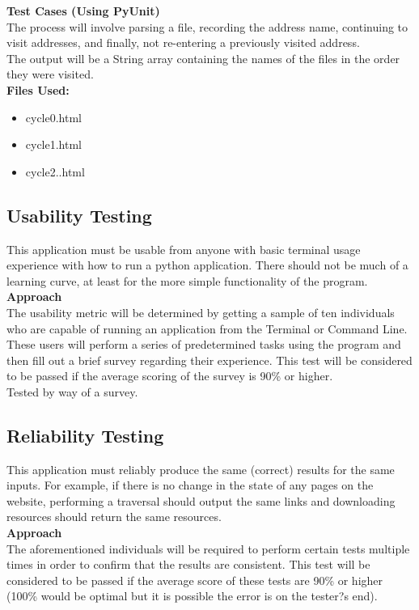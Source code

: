\documentclass[12pt, titlepage]{article}
\begin{document}
\textbf{Test Cases (Using PyUnit)}\\
The process will involve parsing a file, recording the address name, continuing to visit addresses, and finally, not re-entering a previously visited address.\\
The output will be a String array containing the names of the files in the order they were visited.\\

\textbf{Files Used:}
\begin{itemize}
\item cycle0.html
\item cycle1.html
\item cycle2..html
\end{itemize}

\subsection{Usability Testing}
This application must be usable from anyone with basic terminal usage experience with how to run a python application. There should not be much of a learning curve, at least for the more simple functionality of the program.\\

\textbf{Approach}\\
The usability metric will be determined by getting a sample of ten individuals who are capable of running an application from the Terminal or Command Line. These users will perform a series of predetermined tasks using the program and then fill out a brief survey regarding their experience. This test will be considered to be passed if the average scoring of the survey is 90\% or higher.\\

Tested by way of a survey.

\subsection{Reliability Testing}
This application must reliably produce the same (correct) results for the same inputs. For example, if there is no change in the state of any pages on the website, performing a traversal should output the same links and downloading resources should return the same resources.\\

\textbf{Approach}\\
The aforementioned individuals will be required to perform certain tests multiple times in order to confirm that the results are consistent. This test will be considered to be passed if the average score of these tests are 90\% or higher (100\% would be optimal but it is possible the error is on the tester?s end).\\
\end{document}
